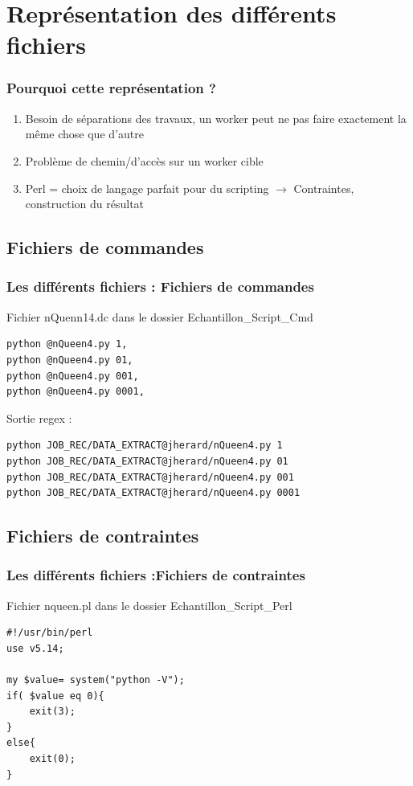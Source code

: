 \documentclass[slidetop,11pt]{beamer}
\begin{document}
\section[Représentation des différents fichiers]{Représentation des différents fichiers}
\begin{frame}[label=diff_fichiers,fragile]
\frametitle{Pourquoi cette représentation ?}
\begin{enumerate}
\item Besoin de séparations des travaux, un worker peut ne pas faire exactement la même chose que  d'autre
\item Problème de chemin/d'accès sur un worker cible 
\item Perl = choix de langage parfait pour du scripting \newline $\rightarrow$ Contraintes, construction du résultat
\end{enumerate}

\end{frame}

\subsection[Fichiers de commandes]{Fichiers de commandes}
\begin{frame}[label=commandes,fragile]
\frametitle{Les différents fichiers : Fichiers de commandes}
Fichier nQuenn14.dc dans le dossier Echantillon\_Script\_Cmd 
\begin{verbatim}
python @nQueen4.py 1,
python @nQueen4.py 01,
python @nQueen4.py 001,
python @nQueen4.py 0001,
\end{verbatim}
\begin{block}{Sortie regex :}
\begin{verbatim}
python JOB_REC/DATA_EXTRACT@jherard/nQueen4.py 1
python JOB_REC/DATA_EXTRACT@jherard/nQueen4.py 01
python JOB_REC/DATA_EXTRACT@jherard/nQueen4.py 001
python JOB_REC/DATA_EXTRACT@jherard/nQueen4.py 0001
\end{verbatim}
\end{block}
\end{frame}

\subsection[Fichiers de contraintes]{Fichiers de contraintes}
\begin{frame}[label=contraintes,fragile]
\frametitle{Les différents fichiers :Fichiers de contraintes}

Fichier nqueen.pl dans le dossier Echantillon\_Script\_Perl 
\begin{verbatim}
#!/usr/bin/perl
use v5.14;

my $value= system("python -V");
if( $value eq 0){
    exit(3);
}
else{
    exit(0);
}
\end{verbatim}
\end{frame}
\end{document}
